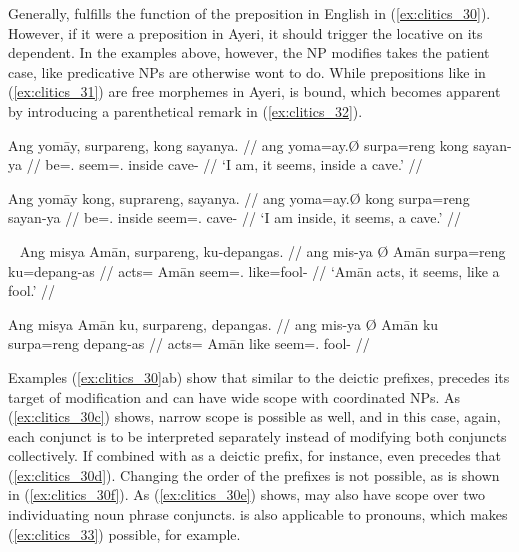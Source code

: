 Generally,  fulfills the function of the preposition 
in English in (\ref{ex:clitics_30}). However, if it were a preposition in
Ayeri, it should trigger the locative on its dependent. In the examples above,
however, the NP  modifies takes the patient case, like
predicative NPs are otherwise wont to do. While prepositions like
 in (\ref{ex:clitics_31}) are free morphemes in Ayeri,
 is bound, which becomes apparent by introducing a parenthetical
remark in (\ref{ex:clitics_32}).

\pex\label{ex:clitics_31}
\a\label{ex:clitics_31a}\begingl
	\gla Ang yomāy, surpareng, kong sayanya. //
	\glb ang yoma=ay.Ø surpa=reng kong sayan-ya //
	\glc \AgtT{} be=\Fsg{}.\Top{} seem=\TsgI{}.\Aarg{} inside cave-\Loc{} //
	\glft `I am, it seems, inside a cave.' //
\endgl

\a\label{ex:clitics_31b}\begingl
	\gla Ang yomāy kong, suprareng, sayanya. //
	\glb ang yoma=ay.Ø kong surpa=reng sayan-ya //
	\glc \AgtT{} be=\Fsg{}.\Top{} inside seem=\TsgI{}.\Aarg{} cave-\Loc{} //
	\glft `I am inside, it seems, a cave.' //
\endgl
\xe

\pex~\label{ex:clitics_32}
\a\label{ex:clitics_32a}\begingl
	\gla Ang misya {} Amān, surpareng, ku-depangas. //
	\glb ang mis-ya Ø Amān surpa=reng ku=depang-as //
	\glc \AgtT{} acts=\TsgM{} \Top{} Amān seem=\TsgI{}.\Aarg{} 
		like=fool-\Parg{} //
	\glft `Amān acts, it seems, like a fool.' //
\endgl

\a\label{ex:clitics_32b}\ljudge{*}\begingl
	\gla Ang misya {} Amān ku, surpareng, depangas. //
	\glb ang mis-ya Ø Amān ku surpa=reng depang-as //
	\glc \AgtT{} acts=\TsgM{} \Top{} Amān like seem=\TsgI{}.\Aarg{} 
		fool-\Parg{} //
\endgl
\xe

Examples (\ref{ex:clitics_30}ab) show that similar to the deictic prefixes,
 precedes its target of modification and can have wide scope
with coordinated NPs. As (\ref{ex:clitics_30c}) shows, narrow scope is possible
as well, and in this case, again, each conjunct is to be interpreted separately
instead of  modifying both conjuncts collectively. If combined
with  as a deictic prefix, for instance,  even
precedes that (\ref{ex:clitics_30d}). Changing the order of the prefixes is not
possible, as is shown in (\ref{ex:clitics_30f}). As (\ref{ex:clitics_30e})
shows,  may also have scope over two individuating noun phrase
conjuncts.  is also applicable to pronouns, which makes
(\ref{ex:clitics_33}) possible, for example.


